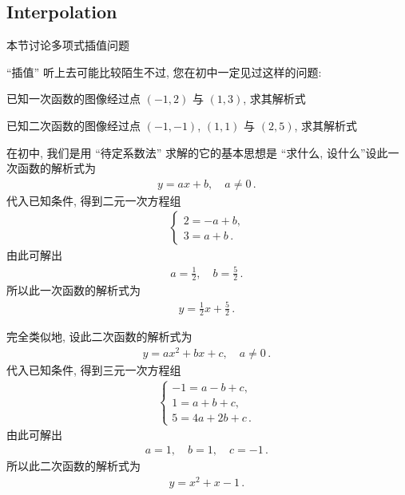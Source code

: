\subsection*{Interpolation}

本节讨论多项式插值问题\period

``插值'' 听上去可能比较陌生\period 不过, 您在初中一定见过这样的问题:

\begin{example}
    已知一次函数的图像经过点 $(-1,2)$ 与 $(1,3)$, 求其解析式\period
\end{example}

\begin{example}
    已知二次函数的图像经过点 $(-1,-1)$, $(1,1)$ 与 $(2,5)$, 求其解析式\period
\end{example}

在初中, 我们是用 ``待定系数法''  求解的\period 它的基本思想是 ``求什么, 设什么''\period 设此一次函数的解析式为
\begin{align*}
    y = ax + b, \quad a \neq 0 \period
\end{align*}
代入已知条件, 得到二元一次方程组
\begin{align*}
    \begin{cases}
        2 = -a + b, \\
        3 = a + b \period
    \end{cases}
\end{align*}
由此可解出
\begin{align*}
    a = \frac12, \quad b = \frac52 \period
\end{align*}
所以此一次函数的解析式为
\begin{align*}
    y = \frac12 x + \frac52 \period
\end{align*}

完全类似地, 设此二次函数的解析式为
\begin{align*}
    y = ax^2 + bx + c, \quad a \neq 0 \period
\end{align*}
代入已知条件, 得到三元一次方程组
\begin{align*}
    \begin{cases}
        -1 = a - b + c, \\
        1 = a + b + c,  \\
        5 = 4a + 2b + c \period
    \end{cases}
\end{align*}
由此可解出
\begin{align*}
    a = 1, \quad b = 1, \quad c = -1 \period
\end{align*}
所以此二次函数的解析式为
\begin{align*}
    y = x^2 + x - 1 \period
\end{align*}

